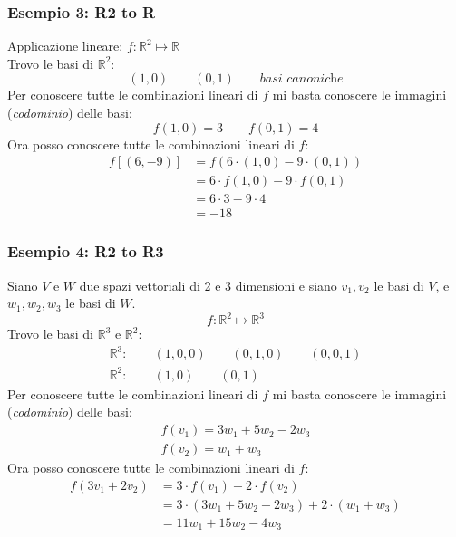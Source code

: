 \documentclass[italian]{article}
\newcommand{\ins}[1]{\text{$\mathbb{#1}$}}
\begin{document}
\subsubsection{Esempio 3: R2 to R }
Applicazione lineare: $f: \ins{R}^2 \longmapsto \ins{R}$\\
Trovo le basi di $\ins{R}^2$:
\[
	(1,0) \qquad (0,1) \qquad \textit{basi canoniche}
\]
Per conoscere tutte le combinazioni lineari di $f$ mi basta conoscere le immagini (\textit{codominio}) delle basi:
\[
	f(1,0) = 3 \qquad f(0,1) = 4
\]
Ora posso conoscere tutte le combinazioni lineari di $f$:
\[
	\begin{split}
	 f[(6,-9)] &= f(6\cdot (1,0) - 9\cdot(0,1)) \\
	 &= 6\cdot f(1,0) - 9\cdot f(0,1) \\
	 &= 6\cdot 3 - 9 \cdot 4 \\
	 &= -18
	\end{split}
\]

\noindent
\subsubsection{Esempio 4: R2 to R3}
Siano $V$ e $W$ due spazi vettoriali di 2 e 3 dimensioni e siano $v_1, v_2 $ le basi di $V$, e $w_1,w_2,w_3$ le basi di $W$.
\[
	f: \ins{R}^2 \longmapsto \ins{R}^3
\]
Trovo le basi di $\ins{R}^3$ e $\ins{R}^2$:
\begin{gather*}
	\ins{R}^3: \qquad (1,0,0) \qquad (0,1,0) \qquad (0,0,1)\\
	\ins{R}^2: \qquad (1,0) \qquad (0,1)
\end{gather*}
Per conoscere tutte le combinazioni lineari di $f$ mi basta conoscere le immagini (\textit{codominio}) delle basi:
\begin{gather*}
	f(v_1) = 3w_1 + 5w_2 - 2w_3 \\
	f(v_2) = w_1 + w_3
\end{gather*}
Ora posso conoscere tutte le combinazioni lineari di $f$:
\[
	\begin{split}
		f(3v_1 + 2v_2) &= 3\cdot f(v_1) + 2\cdot f(v_2) \\
		&= 3\cdot(3w_1 + 5w_2 - 2w_3) + 2\cdot(w_1+w_3) \\
		&= 11w_1 + 15w_2 - 4w_3	
	\end{split}
\]

\newpage
\noindent
\end{document}
